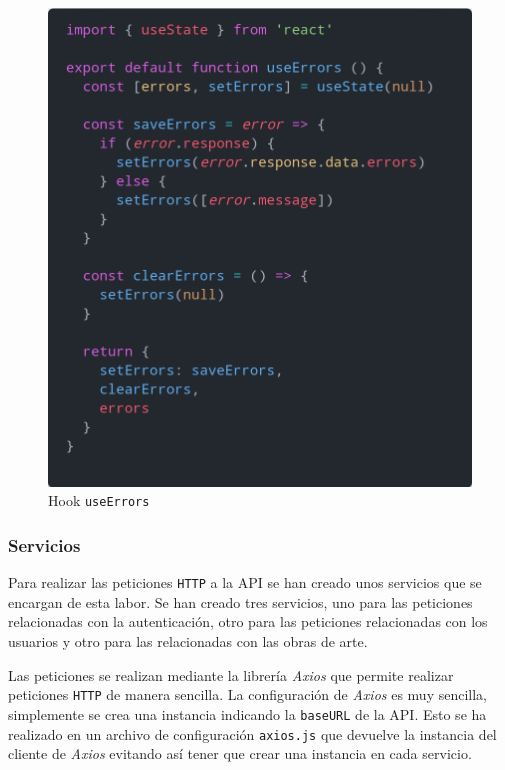 \begin{figure}[H]
  \centering
  \includegraphics[width=\textwidth]{img/use-errors}
  \caption{Hook \texttt{useErrors}}
  \label{fig:use-errors}
\end{figure}

\subsubsection{Servicios}
Para realizar las peticiones \texttt{HTTP} a la API se han creado unos servicios que
se encargan de esta labor. Se han creado tres servicios, uno para las peticiones relacionadas
con la autenticación, otro para las peticiones relacionadas con los usuarios y otro para
las relacionadas con las obras de arte.

Las peticiones se realizan mediante la librería \textit{Axios} \cite{axios} que permite
realizar peticiones \texttt{HTTP} de manera sencilla. La configuración de \textit{Axios}
\cite{axios} es muy sencilla, simplemente se crea una instancia indicando la \texttt{baseURL}
de la API. Esto se ha realizado en un archivo de configuración \texttt{axios.js} que devuelve
la instancia del cliente de \textit{Axios} \cite{axios} evitando así tener que crear una
instancia en cada servicio.

